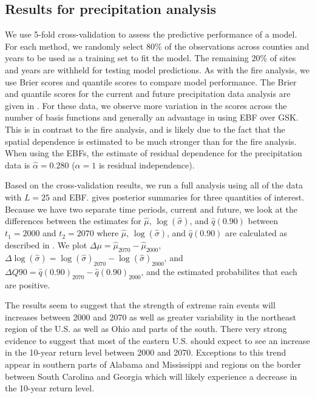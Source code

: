 \documentclass[11pt]{article}
\begin{document}
\subsection{Results for precipitation analysis}\label{ebs:results-precip}
We use 5-fold cross-validation to assess the predictive performance of a model.
For each method, we randomly select 80\% of the observations across counties and years to be used as a training set to fit the model.
The remaining 20\% of sites and years are withheld for testing model predictions.
As with the fire analysis, we use Brier scores and quantile scores to compare model performance.
The Brier and quantile scores for the current and future precipitation data analysis are given in .
For these data, we observe more variation in the scores across the number of basis functions and generally an advantage in using EBF over GSK.
This is in contrast to the fire analysis, and is likely due to the fact that the spatial dependence is estimated to be much stronger than for the fire analysis.
When using the EBFs, the estimate of residual dependence for the precipitation data is $\hat{\alpha} = 0.280$ ($\alpha = 1$ is residual independence).

Based on the cross-validation results, we run a full analysis using all of the data with $L = 25$ and EBF.
 gives posterior summaries for three quantities of interest.
Because we have two separate time periods, current and future, we look at the differences between the estimates for $\hat{\mu}$, $\log(\hat{\sigma})$, and $\hat{q}(0.90)$ between $t_1 = 2000$ and $t_2 = 2070$ where $\hat{\mu}$, $\log(\hat{\sigma})$, and $\hat{q}(0.90)$ are calculated as described in .
We plot \mbox{$\Delta \mu = \hat{\mu}_{2070} - \hat{\mu}_{2000}$}, \mbox{$\Delta \log(\hat{\sigma}) = \log(\hat{\sigma})_{2070} - \log(\hat{\sigma})_{2000}$}, and \mbox{$\Delta Q90 = \hat{q}(0.90)_{2070} - \hat{q}(0.90)_{2000}$}, and the estimated probabilites that each are positive.

The results seem to suggest that the strength of extreme rain events will increases between 2000 and 2070 as well as greater variability in the northeast region of the U.S. as well as Ohio and parts of the south.
There very strong evidence to suggest that most of the eastern U.S. should expect to see an increase in the 10-year return level between 2000 and 2070.
Exceptions to this trend appear in southern parts of Alabama and Mississippi and regions on the border between South Carolina and Georgia which will likely experience a decrease in the 10-year return level.
\end{document}
